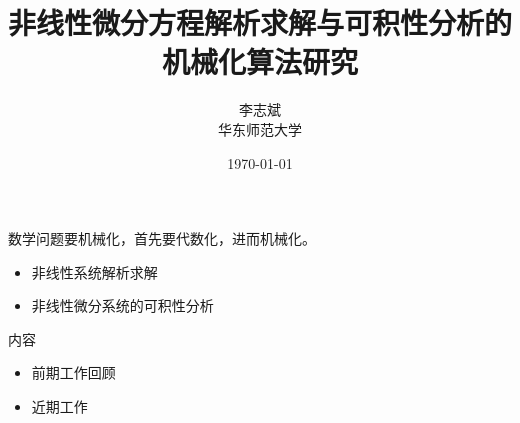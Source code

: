 \documentclass{beamer}
\title[]{非线性微分方程解析求解与可积性分析的机械化算法研究}
\author[]{李志斌 \\[1em] 华东师范大学}
\date{\today}
\begin{document}

\begin{frame}
     \mbox{} \hskip 2cm 数学问题要机械化，首先要代数化，进而机械化。\\[3mm]
     \begin{itemize}
     \item 非线性系统解析求解
     \item 非线性微分系统的可积性分析
     \end{itemize}
\end{frame}
\begin{frame}{内容}
\begin{itemize}
  \item 前期工作回顾 
  \item 近期工作
  \end{itemize}
\end{frame}
\end{document}
